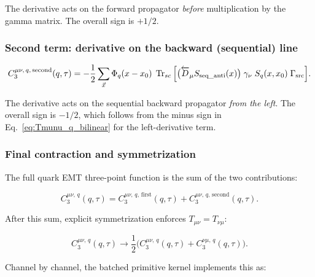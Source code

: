 \documentclass[11pt,a4paper]{article}
\begin{document}
The derivative acts on the forward propagator \emph{before} multiplication by the gamma matrix. The overall sign is $+1/2$.

\subsubsection{Second term: derivative on the backward (sequential) line}

\begin{equation}\label{eq:C3_second}
  C_3^{\mu\nu,\,q,\,\text{second}}(q, \tau)
    = -\frac{1}{2} \sum_{\vec{x}} \Phi_q(x - x_0)\;
      \Tr_{sc}\Big[
        \big(\overleftarrow{D}_\mu S_{\text{seq\_anti}}(x)\big)\;
        \gamma_\nu\; S_q(x, x_0)\;
        \Gamma_{\text{src}}
      \Big].
\end{equation}

The derivative acts on the sequential backward propagator \emph{from the left}. The overall sign is $-1/2$, which follows from the minus sign in Eq.~\eqref{eq:Tmunu_q_bilinear} for the left-derivative term.

\subsubsection{Final contraction and symmetrization}

The full quark EMT three-point function is the sum of the two contributions:

\begin{equation}\label{eq:C3_Tmunu_sum}
  C_3^{\mu\nu,\,q}(q, \tau)
    = C_3^{\mu\nu,\,q,\,\text{first}}(q, \tau)
    + C_3^{\mu\nu,\,q,\,\text{second}}(q, \tau).
\end{equation}

After this sum, explicit symmetrization enforces $T_{\mu\nu} = T_{\nu\mu}$:

\begin{equation}\label{eq:symmetrization}
  C_3^{\mu\nu,\,q}(q, \tau) \to
    \frac{1}{2}\big(
      C_3^{\mu\nu,\,q}(q, \tau) + C_3^{\nu\mu,\,q}(q, \tau)
    \big).
\end{equation}

Channel by channel, the batched primitive kernel implements this as:
\end{document}

